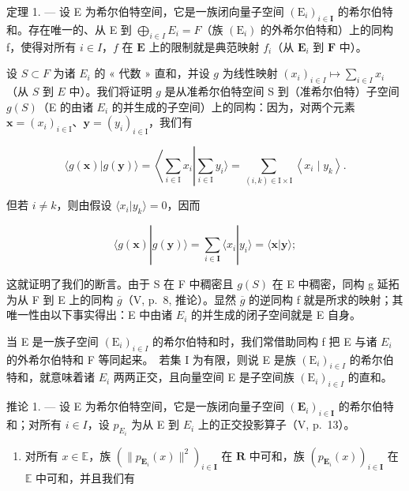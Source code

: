 定理 1. --- 设 E 为希尔伯特空间，它是一族闭向量子空间 \((\mathrm{E}_{i})_{i\in\mathbf{I}}\) 的希尔伯特和。存在唯一的、从 E 到 \(\bigoplus_{i\in I}E_{i}=F\)（族 \((\mathrm{E}_{i})\) 的外希尔伯特和）上的同构 f，使得对所有 \(i\in I\)，\(f\) 在 \(\mathbf{E}\) 上的限制就是典范映射 \(f_{i}\)（从 \(\mathbf{E}_i\) 到 \(\mathbf{F}\) 中）。

设 \(S \subset F\) 为诸 \(E_i\) 的 « 代数 » 直和，并设 \(g\) 为线性映射 \((x_i)_{i \in I} \mapsto \sum_{i \in I} x_i\)（从 \(S\) 到 \(E\) 中）。我们将证明 \(g\) 是从准希尔伯特空间 S 到（准希尔伯特）子空间 \(g(S)\)（E 的由诸 \(E_{i}\) 的并生成的子空间）上的同构：因为，对两个元素 \(\mathbf{x} = (x_{i})_{i \in \mathrm{I}}\)、\(\mathbf{y} = (y_{i})_{i \in \mathrm{I}}\)，我们有

\[
\langle g (\mathbf {x}) | g (\mathbf {y}) \rangle = \left\langle \sum_ {i \in \mathrm{I}} x _ {i} \right| \sum_ {i \in \mathrm{I}} y _ {i} \rangle = \sum_ {(i, k) \in \mathrm{I} \times \mathrm{I}} \left\langle x _ {i} \mid y _ {k} \right\rangle .
\]

但若 \(i \neq k\)，则由假设 \(\langle x_i | y_k \rangle = 0\)，因而

\[
\langle g (\mathbf {x}) | g (\mathbf {y}) \rangle = \sum_ {i \in \mathbf {I}} \langle x _ {i} | y _ {i} \rangle = \langle \mathbf {x} | \mathbf {y} \rangle ;
\]

这就证明了我们的断言。由于 S 在 F 中稠密且 \(g(S)\) 在 E 中稠密，同构 g 延拓为从 F 到 E 上的同构 \(\overline{g}\)（V, p.~8, 推论）。显然 \(\overline{g}\) 的逆同构 f 就是所求的映射；其唯一性由以下事实得出：E 中由诸 \(E_{i}\) 的并生成的闭子空间就是 E 自身。

当 E 是一族子空间 \((\mathrm{E}_{i})_{i\in I}\) 的希尔伯特和时，我们常借助同构 f 把 E 与诸 \(E_{i}\) 的外希尔伯特和 F 等同起来。~若集 I 为有限，则说 E 是族 \((\mathrm{E}_{i})_{i\in I}\) 的希尔伯特和，就意味着诸 \(E_{i}\) 两两正交，且向量空间 E 是子空间族 \((\mathrm{E}_{i})_{i\in I}\) 的直和。

推论 1. --- 设 E 为希尔伯特空间，它是一族闭向量子空间 \((\mathbf{E}_{i})_{i\in\mathbf{I}}\) 的希尔伯特和；对所有 \(i\in I\)，设 \(p_{E_{i}}\) 为从 E 到 \(E_{i}\) 上的正交投影算子（V, p.~13）。

\begin{enumerate}
\def\labelenumi{\alph{enumi})}
\tightlist
\item
  对所有 \(x \in \mathbb{E}\)，族 \((\| p_{\mathbf{E}_i}(x)\|^{2})_{i\in \mathbf{I}}\) 在 \(\mathbf{R}\) 中可和，族 \((p_{\mathbf{E}_i}(x))_{i\in \mathbf{I}}\) 在 \(\mathbb{E}\) 中可和，并且我们有
\end{enumerate}

